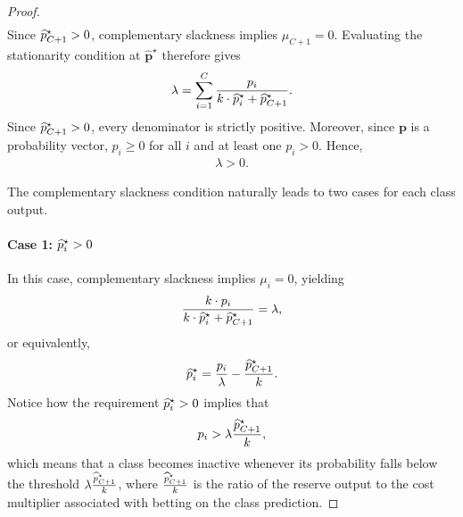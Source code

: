 \begin{proof}
\begin{align*}
    \end{align*}
    Since $\widehat{p}_{C+1}^\star>0$, complementary slackness implies $\mu_{C+1}=0$. Evaluating the stationarity condition at $\hat{\mathbf p}^\star$ therefore gives
    \begin{align*}
        \lambda = \sum_{i=1}^{C}\frac{p_i}{k\cdot\widehat{p}_i^\star+\widehat{p}_{C+1}^\star}.
    \end{align*}
    Since $\widehat{p}_{C+1}^\star>0$, every denominator is strictly positive. Moreover, since $\mathbf p$ is a probability vector, $p_i\ge0$ for all $i$ and at least one $p_i>0$. Hence,
    \begin{align*}
        \lambda>0.
    \end{align*}

    The complementary slackness condition naturally leads to two cases for each class output.

    \paragraph{Case 1: $\widehat{p}_i^\star>0$}
    In this case, complementary slackness implies $\mu_i=0$, yielding
    \begin{align*}
        \frac{k\cdot p_i}{k\cdot\widehat{p}_i^\star+\widehat{p}_{C+1}^\star} = \lambda,
    \end{align*}
    or equivalently,
    \begin{align*}
        \widehat{p}_i^\star = \frac{p_i}{\lambda}-\frac{\widehat{p}_{C+1}^\star}{k}.
    \end{align*}
    Notice how the requirement $\widehat{p}_i^\star>0$ implies that
    \begin{align*}
        p_i>\lambda\frac{\widehat{p}_{C+1}^\star}{k},
    \end{align*}
    which means that a class becomes inactive whenever its probability falls below the threshold \(\lambda\frac{\widehat{p}_{C+1}^\star}{k}\), where \(\frac{\widehat{p}_{C+1}^\star}{k}\) is the ratio of the reserve output to the cost multiplier associated with betting on the class prediction.


\end{proof}
